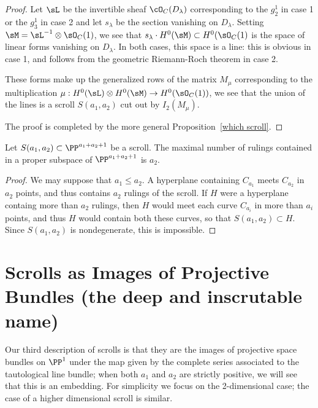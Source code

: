 \begin{proof}
Let $\sL$ be the invertible sheaf $\cO_C(D_\lambda)$ corresponding to the $g^1_2$ in case 1 or
the $g_3^1$ in case 2 and let $s_\lambda$ be
the section vanishing on $D_\lambda$. Setting $\sM =  \sL^{-1}\otimes \sO_C(1)$, we see that
$s_\lambda\cdot H^0(\sM) \subset H^0(\sO_C(1)$ is the space of linear forms vanishing on
$D_\lambda$. In both cases, this space is a line: this is obvious in case 1, and follows from the 
geometric Riemann-Roch theorem in case 2. 

These forms make up the
generalized rows of the matrix $M_\mu$ corresponding to the multiplication
$\mu: H^0(\sL)\otimes H^0(\sM) \to H^0(\sO_C(	1))$, we see that the union of the lines is a
scroll $S(a_1,a_2)$ cut out by $I_2(M_\mu)$.

The proof is completed by the more general Proposition~\ref{which scroll}.
\end{proof}

\begin{proposition}\label{which scroll}
Let $S(a_1,a_2)\subset \PP^{a_1+a_2+1}$ be a scroll. The maximal number of rulings contained in
a proper subspace of $ \PP^{a_1+a_2+1}$ is $a_2$.
\end{proposition}

\begin{proof}
We may suppose that $a_1\leq a_2$. A hyperplane containing $C_{a_1}$ meets $C_{a_2}$ in $a_2$
points, and thus contains $a_2$ rulings of the scroll. If $H$ were a hyperplane containg more than $a_2$
rulings, then $H$ would meet each curve $C_{a_i}$ in more than $a_i$ points, and thus $H$ would contain
both these curves, so that $S(a_1,a_2)\subset H$. Since $S(a_1,a_2)$ is nondegenerate, this is impossible.
\end{proof}


\section{Scrolls as Images of Projective Bundles (the deep and inscrutable name)}\label{inscrutable name}

Our third description of scrolls is that they are the images of projective space bundles on $\PP^{1}$ under the map given by the complete series associated to the tautological line bundle; when both $a_{1}$ and $a_{2}$ are strictly positive, we will see that this is an embedding. For simplicity we focus on the 2-dimensional case; the case of a higher dimensional scroll is similar. 

